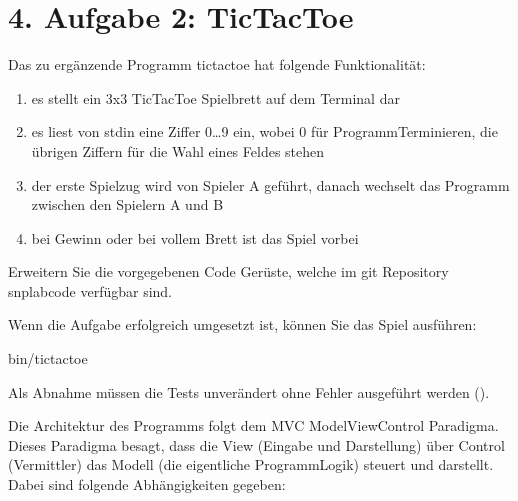 \documentclass[a4paper,10pt,english]{report}
\begin{document}
\section{4. Aufgabe 2: TicTacToe}
\label{\detokenize{P05_TicTacToe/README:aufgabe-2-tictactoe}}
\sphinxAtStartPar
Das zu ergänzende Programm tic\sphinxhyphen{}tac\sphinxhyphen{}toe hat folgende Funktionalität:
\begin{enumerate}
%
\item {} 
\sphinxAtStartPar
es stellt ein 3x3 TicTacToe Spielbrett auf dem Terminal dar

\item {} 
\sphinxAtStartPar
es liest von stdin eine Ziffer 0…9 ein, wobei 0 für Programm\sphinxhyphen{}Terminieren, die übrigen Ziffern für die Wahl eines Feldes stehen

\item {} 
\sphinxAtStartPar
der erste Spielzug wird von Spieler A geführt, danach wechselt das Programm zwischen den Spielern A und B

\item {} 
\sphinxAtStartPar
bei Gewinn oder bei vollem Brett ist das Spiel vorbei

\end{enumerate}

\sphinxAtStartPar
Erweitern Sie die vorgegebenen Code Gerüste, welche im git Repository snp\sphinxhyphen{}lab\sphinxhyphen{}code verfügbar sind.

\sphinxAtStartPar
Wenn die Aufgabe erfolgreich umgesetzt ist, können Sie das Spiel ausführen:

\begin{sphinxVerbatim}[commandchars=\\\{\}]
bin/tic\PYGZhy{}tac\PYGZhy{}toe
\end{sphinxVerbatim}

\sphinxAtStartPar
{}

\sphinxAtStartPar
Als Abnahme müssen die Tests unverändert ohne Fehler ausgeführt werden ().

\sphinxAtStartPar
Die Architektur des Programms folgt dem MVC \textendash{} Model\sphinxhyphen{}View\sphinxhyphen{}Control Paradigma. Dieses Paradigma besagt, dass die View (Eingabe und Darstellung) über Control (Vermittler) das Modell (die eigentliche Programm\sphinxhyphen{}Logik) steuert und darstellt. Dabei sind folgende Abhängigkeiten gegeben:
\end{document}
